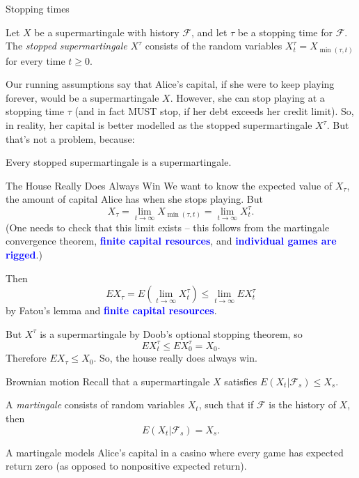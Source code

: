 \documentclass[10pt]{beamer}
\newcommand{\attn}[1]{\textbf{\textcolor{blue}{#1}}}
\begin{document}
\begin{frame}{Stopping times}
\begin{definition}
Let $X$ be a supermartingale with history $\mathcal F$, and let $\tau$ be a stopping time for $\mathcal F$.
The \emph{stopped supermartingale} $X^\tau$ consists of the random variables $X^\tau_t = X_{\min(\tau, t)}$ for every time $t \geq 0$.
\end{definition}

Our running assumptions say that Alice's capital, if she were to keep playing forever, would be a supermartingale $X$.
However, she can stop playing at a stopping time $\tau$ (and in fact MUST stop, if her debt exceeds her credit limit).
So, in reality, her capital is better modelled as the stopped supermartingale $X^\tau$.
But that's not a problem, because:

\begin{theorem}
Every stopped supermartingale is a supermartingale.
\end{theorem}
\end{frame}

\begin{frame}{The House Really Does Always Win}
We want to know the expected value of $X_\tau$, the amount of capital Alice has when she stops playing. But
$$X_\tau = \lim_{t \to \infty} X_{\min(\tau, t)} = \lim_{t \to \infty} X_t^\tau.$$
(One needs to check that this limit exists -- this follows from the martingale convergence theorem, \attn{finite capital resources}, and \attn{individual games are rigged}.)

Then
$$EX_\tau = E\left(\lim_{t \to \infty} X_t^\tau\right) \leq \lim_{t \to \infty} EX_t^\tau$$
by Fatou's lemma and \attn{finite capital resources}.

But $X^\tau$ is a supermartingale by Doob's optional stopping theorem, so
$$EX_t^\tau \leq EX_0^\tau = X_0.$$
Therefore $EX_\tau \leq X_0$. So, the house really does always win.
\end{frame}

\begin{frame}{Brownian motion}
Recall that a supermartingale $X$ satisfies $E(X_t|\mathcal F_s) \leq X_s$.

\begin{definition}
A \emph{martingale} consists of random variables $X_t$, such that if $\mathcal F$ is the history of $X$, then
$$E(X_t|\mathcal F_s) = X_s.$$
\end{definition}

A martingale models Alice's capital in a casino where every game has expected return zero (as opposed to nonpositive expected return).
\end{frame}
\end{document}
